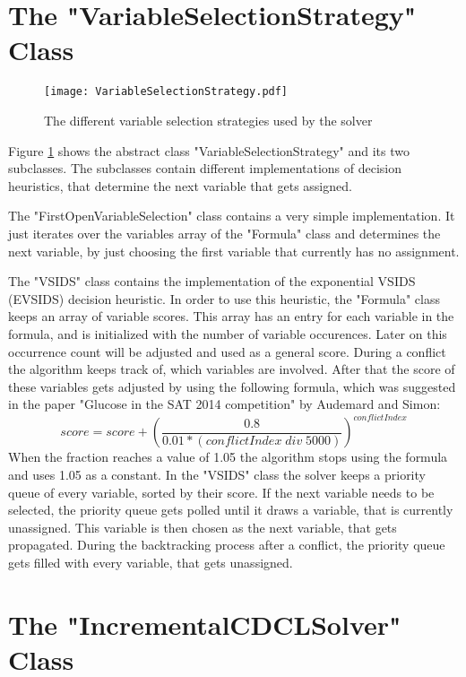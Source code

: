 \section{The "VariableSelectionStrategy" Class}

\begin{figure}[htbp]
  \centering
  \texttt{[image: VariableSelectionStrategy.pdf]}
  \caption{The different variable selection strategies used by the solver}
  \label{fig:variableSelection}
\end{figure}

Figure \ref{fig:variableSelection} shows the abstract class "VariableSelectionStrategy" and its two subclasses. The subclasses contain different implementations of decision heuristics, that determine the next variable that gets assigned.

The "FirstOpenVariableSelection" class contains a very simple implementation. It just iterates over the variables array of the "Formula" class and determines the next variable, by just choosing the first variable that currently has no assignment.

The "VSIDS" class contains the implementation of the exponential VSIDS (EVSIDS) decision heuristic. In order to use this heuristic, the "Formula" class keeps an array of variable scores. This array has an entry for each variable in the formula, and is initialized with the number of variable occurences. Later on this occurrence count will be adjusted and used as a general score. During a conflict the algorithm keeps track of, which variables are involved. After that the score of these variables gets adjusted by using the following formula, which was suggested in the paper "Glucose in the SAT 2014 competition" \cite{audemard2014glucose} by Audemard and Simon:
\begin{displaymath}
score = score + (\frac{0.8}{0.01 * (conflictIndex \; div \; 5000)})^{conflictIndex}
\end{displaymath}
When the fraction reaches a value of 1.05 the algorithm stops using the formula and uses 1.05 as a constant.
In the "VSIDS" class the solver keeps a priority queue of every variable, sorted by their score. If the next variable needs to be selected, the priority queue gets polled until it draws a variable, that is currently unassigned. This variable is then chosen as the next variable, that gets propagated. During the backtracking process after a conflict, the priority queue gets filled with every variable, that gets unassigned.

\section{The "IncrementalCDCLSolver" Class}

